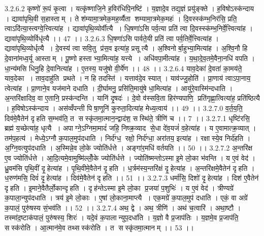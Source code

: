 3.2.6.2
कृष्णो॑ रू॒पं कृ॒त्वा । यत्कृ॑ष्णाजि॒ने ह॒विर॑धिपि॒नष्टि॑ । य॒ज्ञादे॒व तद्य॒ज्ञं प्रयु॑ङ्क्ते । ह॒विषोऽस्क॑न्दाय । द्यावा॑पृथि॒वी स॒हास्ताम् । ते श॑म्यामा॒त्रमेक॒मह॒र्व्यैता॑ शम्यामा॒त्रमेक॒महः॑ । दि॒वस्स्क॑म्भ॒निर॑सि॒ प्रति॒ त्वाऽदि॑त्या॒स्त्वग्वे॒त्त्वित्या॑ह । द्यावा॑पृथि॒व्योर्वीत्यै । धि॒षणा॑ऽसि पर्व॒त्या प्रति॑ त्वा दि॒वस्स्क॑म्भ॒निर्वे॒त्त्वित्या॑ह । द्यावा॑पृथि॒व्योर्विधृ॑त्यै ।। 47 ।।
3.2.6.3
धि॒षणा॑ऽसि पार्वते॒यी प्रति॑ त्वा पर्व॒तिर्वे॒त्त्वित्या॑ह । द्यावा॑पृथि॒व्योर्धृत्यै । दे॒वस्य॑ त्वा सवि॒तु प्र॑स॒व इत्या॑ह॒ प्रसूत्यै । अ॒श्विनोर्बा॒हुभ्या॒मित्या॑ह । अ॒श्वि॒नौ हि दे॒वाना॑मध्व॒र्यू आस्ताम् । पू॒ष्णो हस्ताभ्या॒मित्या॑ह॒ यत्त्ये । अधि॑वपा॒मीत्या॑ह । य॒था॒दे॒व॒तमे॒वैना॒नधि॑ वपति । धा॒न्य॑मसि धिनु॒हि दे॒वानित्या॑ह । ए॒तस्य॒ यजु॑षो वी॒र्ये॑ण ।। 48 ।।
3.2.6.4
याव॒देका॑ दे॒वता॑ का॒मय॑ते॒ याव॒देका । ताव॒दाहु॑ति प्रथते । न हि तदस्ति॑ । यत्ताव॑दे॒व स्यात् । याव॑ज्जु॒होति॑ । प्रा॒णाय॑ त्वाऽपा॒नाय॒ त्वेत्या॑ह । प्रा॒णाने॒व यज॑माने दधाति । दी॒र्घामनु॒ प्रसि॑ति॒मायु॑षे धा॒मित्या॑ह । आयु॑रे॒वास्मि॑न्दधाति । अ॒न्तरि॑क्षादिव॒ वा ए॒तानि॒ प्रस्क॑न्दन्ति । यानि॑ दृ॒षदः॑ । दे॒वो व॑स्सवि॒ता हिर॑ण्यपाणि॒ प्रति॑गृह्णा॒त्वित्या॑ह॒ प्रति॑ष्ठित्यै । ह॒विषोऽस्क॑न्दाय । अस॑व्वँपन्ती पिषा॒णूनि॑ कुरुता॒दित्या॑ह मेध्य॒त्वाय॑ ।। 49 ।।
3.2.7.0
व॒र्त॒य॒ति॒ दिव॑मे॒वैतेन॑ दृहति स॒म्भव॑ति॒ त सस्कृ॑तमा॒त्मान॒न्द्वाद॑श॒ सस्थि॑ते॒ त्रीणि॑ च ।। 7 ।।
3.2.7.1
धृष्टि॑रसि॒ ब्रह्म॑ य॒च्छेत्या॑ह॒ धृत्यै । अपाग्ने॒ऽग्निमा॒मादं॑ जहि॒ निष्क्र॒व्याद॑ से॒धा दे॑व॒यजं॑ व॒हेत्या॑ह । य ए॒वामात्क्र॒व्यात् । तम॑प॒हत्य॑ । मेध्ये॒ऽग्नौ क॒पाल॒मुप॑दधाति । निर्द॑ग्ध॒॒ रक्षो॒ निर्द॑ग्धा॒ अरा॑तय॒ इत्या॑ह । रक्षा॑स्ये॒व निर्द॑हति । अ॒ग्नि॒वत्युप॑दधाति । अ॒स्मिन्ने॒व लो॒के ज्योति॑र्धत्ते । अङ्गा॑र॒मधि॑ वर्तयति ।। 50 ।।
3.2.7.2
अ॒न्तरि॑क्ष ए॒व ज्योति॑र्धत्ते । आ॒दि॒त्यमे॒वामुष्मि॑ल्लोँ॒के ज्योति॑र्धत्ते । ज्योति॑ष्मन्तोऽस्मा इ॒मे लो॒का भ॑वन्ति । य ए॒वं वेद॑ । ध्रु॒वम॑सि पृथि॒वीं दृ॒॒हेत्या॑ह । पृ॒थि॒वीमे॒वैतेन॑ दृ॒हति । ध॒र्त्रम॑स्य॒न्तरि॑क्षं दृ॒॒हेत्या॑ह । अ॒न्तरि॑क्षमे॒वैतेन॑ दृहति । ध॒रुण॑मसि॒ दिवं॑ दृ॒॒हेत्या॑ह । दिव॑मे॒वैतेन॑ दृहति ।। 51 ।।
3.2.7.3
धर्मा॑सि॒ दिशो॑ दृ॒॒हेत्या॑ह । दिश॑ ए॒वैतेन॑ दृहति । इ॒माने॒वैतैर्लो॒कान्दृ॑हति । दृह॑न्तेऽस्मा इ॒मे लो॒का प्र॒जया॑ प॒शुभिः॑ । य ए॒वं वेद॑ । त्रीण्यग्रे॑ क॒पाला॒न्युप॑दधाति । त्रय॑ इ॒मे लो॒काः । ए॒षां लो॒काना॒माप्त्यै । एक॒मग्रे॑ क॒पाल॒मुप॑ दधाति । एकं॒ वा अग्रे॑ क॒पालं॒ पुरु॑षस्य सं॒भव॑ति ।। 52 ।।
3.2.7.4
अथ॒ द्वे । अथ॒ त्रीणि॑ । अथ॑ च॒त्वारि॑ । अथा॒ष्टौ । तस्मा॑द॒ष्टाक॑पालं॒ पुरु॑षस्य॒ शिरः॑ । यदे॒वं क॒पालान्युप॒दधा॑ति । य॒ज्ञो वै प्र॒जाप॑तिः । य॒ज्ञमे॒व प्र॒जाप॑ति॒॒ सस्क॑रोति । आ॒त्मान॑मे॒व तथ्सस्क॑रोति । त सस्कृ॑तमा॒त्मानम् ।। 53 ।।
